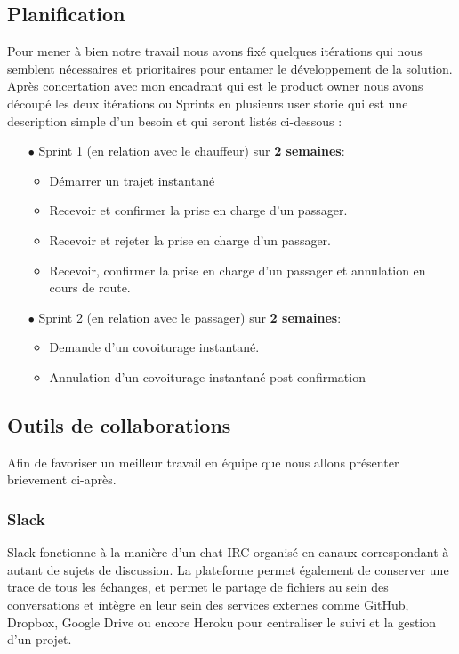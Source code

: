 \subsection{Planification} %
\label{sub:planification}
Pour mener à bien notre travail nous avons fixé quelques itérations qui nous semblent nécessaires et prioritaires pour entamer le développement de la solution. Après concertation avec mon encadrant qui est le product owner nous avons découpé les deux itérations ou Sprints en plusieurs user storie qui est une description simple d’un besoin et qui seront listés ci-dessous :
\begin{itemize}
	\item[$\bullet$] Sprint 1 (en relation avec le chauffeur) sur \textbf{2 semaines}:
		\begin{itemize}
			\item Démarrer un trajet instantané
			\item Recevoir et confirmer la prise en charge d’un passager.
			\item Recevoir et rejeter la prise en charge d’un passager.
			\item Recevoir, confirmer la prise en charge d’un passager et annulation en cours de route.
		\end{itemize}
	\item[$\bullet$] Sprint 2 (en relation avec le passager) sur \textbf{2 semaines}:
		\begin{itemize}
			\item Demande d’un covoiturage instantané.
			\item Annulation d’un covoiturage instantané post-confirmation
	\end{itemize}
\end{itemize}

\subsection{Outils de collaborations} %
\label{sub:outils_de_collaborations}

Afin de favoriser un meilleur travail en équipe que nous allons présenter brievement ci-après.
\subsubsection{Slack} %
\label{ssub:subsubsection_name}

Slack fonctionne à la manière d'un chat IRC organisé en canaux correspondant à autant de sujets de discussion. La plateforme permet également de conserver une trace de tous les échanges, et permet le partage de fichiers au sein des conversations et intègre en leur sein des services externes comme GitHub, Dropbox, Google Drive ou encore Heroku pour centraliser le suivi et la gestion d'un projet. 

